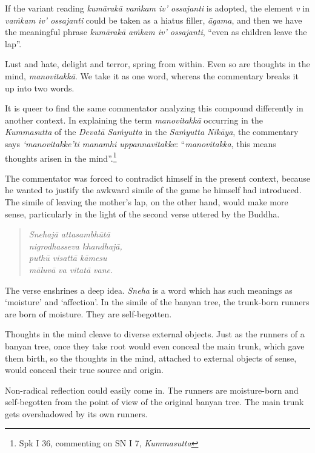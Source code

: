 If the variant reading \emph{kumārakā vaṁkam iv' ossajanti} is adopted, the element \emph{v} in \emph{vaṁkam iv' ossajanti} could be taken as a hiatus filler, \emph{āgama}, and then we have the meaningful phrase \emph{kumārakā aṁkam iv' ossajanti}, ``even as children leave the lap''.

Lust and hate, delight and terror, spring from within. Even so are thoughts in the mind, \emph{manovitakkā}. We take it as one word, whereas the commentary breaks it up into two words.

It is queer to find the same commentator analyzing this compound differently in another context. In explaining the term \emph{manovitakkā} occurring in the \emph{Kummasutta} of the \emph{Devatā Saṁyutta} in the \emph{Saṁyutta Nikāya}, the commentary says \emph{`manovitakke'ti manamhi uppannavitakke}: ``\emph{manovitakka}, this means thoughts arisen in the mind''.\footnote{Spk I 36, commenting on SN I 7, \emph{Kummasutta}}

The commentator was forced to contradict himself in the present context, because he wanted to justify the awkward simile of the game he himself had introduced. The simile of leaving the mother's lap, on the other hand, would make more sense, particularly in the light of the second verse uttered by the Buddha.

\clearpage

\begin{quote}
\emph{Snehajā attasambhūtā}\\
\emph{nigrodhasseva khandhajā,}\\
\emph{puthū visattā kāmesu}\\
\emph{māluvā va vitatā vane.}
\end{quote}

The verse enshrines a deep idea. \emph{Sneha} is a word which has such meanings as `moisture' and `affection'. In the simile of the banyan tree, the trunk-born runners are born of moisture. They are self-begotten.

Thoughts in the mind cleave to diverse external objects. Just as the runners of a banyan tree, once they take root would even conceal the main trunk, which gave them birth, so the thoughts in the mind, attached to external objects of sense, would conceal their true source and origin.

Non-radical reflection could easily come in. The runners are moisture-born and self-begotten from the point of view of the original banyan tree. The main trunk gets overshadowed by its own runners.


